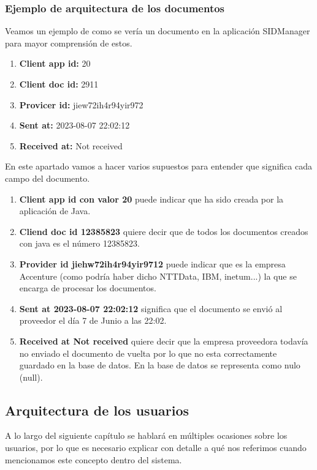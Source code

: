 \documentclass[draft]{scrbook}
\begin{document}
\subsubsection{ Ejemplo de arquitectura de los documentos}

Veamos un ejemplo de como se vería un documento en la aplicación SIDManager para mayor comprensión de estos.
\begin{enumerate}
    \item \textbf{ Client app id:} 20
    \item \textbf{ Client doc id: } 2911	
    \item \textbf{ Provicer id: } jiew72ih4r94yir972	
    \item \textbf{ Sent at: } 2023-08-07 22:02:12	
    \item \textbf{ Received at: } Not received
\end{enumerate}

En este apartado vamos a hacer varios supuestos para entender que significa cada campo del documento.
\begin{enumerate}
    \item \textbf{Client app id con valor 20 } puede indicar que ha sido creada por la aplicación de Java.
    \item \textbf{ Cliend doc id 12385823 } quiere decir que de todos los documentos creados con java es el número 12385823.
    \item \textbf{ Provider id jiehw72ih4r94yir9712}  puede indicar que es la empresa Accenture (como podría haber dicho NTTData, IBM, inetum...) la que se encarga de procesar los documentos.
    \item \textbf{ Sent at 2023-08-07 22:02:12 } significa que el documento se envió al proveedor el día 7 de Junio a las 22:02.
    \item \textbf{ Received at Not received} quiere decir que la empresa proveedora todavía no enviado el documento de vuelta por lo que no esta correctamente guardado en la base de datos. En la base de datos se representa como nulo (null).
\end{enumerate}


\subsection{Arquitectura de los usuarios}
\label{subsec:user-architecture}

A lo largo del siguiente capítulo se hablará en múltiples ocasiones sobre los usuarios, por lo que es necesario explicar con detalle a qué nos referimos cuando mencionamos este concepto dentro del sistema.
\end{document}
